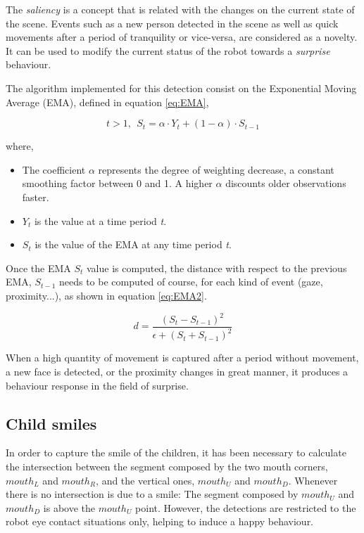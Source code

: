 The \textit{saliency} is a concept that is related with the changes on the current state of the scene. Events such as a new person detected in the scene as well as quick movements after a period of tranquility or vice-versa, are considered as a novelty. It can be used to modify the current status of the robot towards a \textit{surprise} behaviour.

The algorithm implemented for this detection consist on the Exponential Moving Average (EMA), defined in equation \ref{eq:EMA},

\begin{equation} \label{eq:EMA}
 t > 1,\ \    S_{t} = \alpha \cdot Y_{t} + (1-\alpha) \cdot S_{t-1}
\end{equation}

where,

\begin{itemize}
\item The coefficient $ \alpha $ represents the degree of weighting decrease, a constant smoothing factor between 0 and 1. A higher $ \alpha $ discounts older observations faster.
\item $ Y_t $ is the value at a time period \textit{t}.
\item $ S_t $ is the value of the EMA at any time period \textit{t}.
\end{itemize}

Once the EMA $S_t$ value is computed, the distance with respect to the previous EMA, $S_{t-1}$ needs to be computed of course, for each kind of event (gaze, proximity...), as shown in equation \ref{eq:EMA2}.

\begin{equation} \label{eq:EMA2}
d = \frac{(S_t - S_{t-1})^2}{\epsilon + (S_t + S_{t-1})^2 }
\end{equation}

When a high quantity of movement is captured after a period without movement, a new face is detected, or the proximity changes in great manner, it produces a behaviour response in the field of surprise.

\subsection{Child smiles}
In order to capture the smile of the children, it has been necessary to calculate the intersection between the segment composed by the two mouth corners, $ mouth_L $ and $ mouth_R $, and the vertical ones, $mouth_U$ and $mouth_D$. Whenever there is no intersection is due to a smile: The segment composed by $mouth_U$ and $mouth_D$ is above the $mouth_U$ point. However, the detections are restricted to the robot eye contact situations only, helping to induce a happy behaviour.


